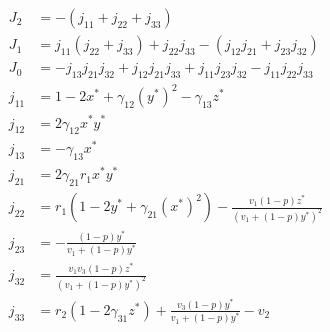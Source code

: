 \begin{align*}
    J_2 &= -\left(j_{11}+j_{22}+j_{33}\right)\\
    J_1 &= j_{11}\left(j_{22}+j_{33}\right)+j_{22}j_{33}-\left(j_{12}j_{21}+j_{23}j_{32}\right)\\
    J_0 &= -j_{13}j_{21}j_{32}+j_{12}j_{21}j_{33}+j_{11}j_{23}j_{32}-j_{11}j_{22}j_{33}\\
    j_{11} &= 1-2x^*+\gamma_{12}\left(y^*\right)^2-\gamma_{13}z^*\\
    j_{12} &= 2\gamma_{12}x^*y^*\\
    j_{13} &= -\gamma_{13}x^*\\
    j_{21} &= 2\gamma_{21}r_1x^*y^*\\
    j_{22} &= r_1\left(1-2y^*+\gamma_{21}\left(x^*\right)^2\right)-\frac{v_1\left(1-p\right)z^*}{\left(v_1+\left(1-p\right)y^*\right)^2}\\
    j_{23} &= -\frac{\left(1-p\right)y^*}{v_1+\left(1-p\right)y^*}\\
    j_{32} &= \frac{v_1v_3\left(1-p\right)z^*}{\left(v_1+\left(1-p\right)y^*\right)^2}\\
    j_{33} &= r_2\left(1-2\gamma_{31}z^*\right)+\frac{v_3\left(1-p\right)y^*}{v_1+\left(1-p\right)y^*}-v_2
\end{align*}